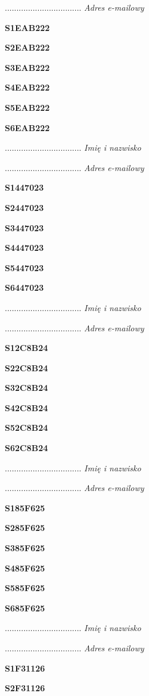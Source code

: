 .................................
\textit{Adres e-mailowy}

\Large \textbf{S1EAB222}

\Large \textbf{S2EAB222}

\Large \textbf{S3EAB222}

\Large \textbf{S4EAB222}

\Large \textbf{S5EAB222}

\Large \textbf{S6EAB222}

.................................
\textit{Imię i nazwisko}

.................................
\textit{Adres e-mailowy}

\Large \textbf{S1447023}

\Large \textbf{S2447023}

\Large \textbf{S3447023}

\Large \textbf{S4447023}

\Large \textbf{S5447023}

\Large \textbf{S6447023}

.................................
\textit{Imię i nazwisko}

.................................
\textit{Adres e-mailowy}

\Large \textbf{S12C8B24}

\Large \textbf{S22C8B24}

\Large \textbf{S32C8B24}

\Large \textbf{S42C8B24}

\Large \textbf{S52C8B24}

\Large \textbf{S62C8B24}

.................................
\textit{Imię i nazwisko}

.................................
\textit{Adres e-mailowy}

\Large \textbf{S185F625}

\Large \textbf{S285F625}

\Large \textbf{S385F625}

\Large \textbf{S485F625}

\Large \textbf{S585F625}

\Large \textbf{S685F625}

.................................
\textit{Imię i nazwisko}

.................................
\textit{Adres e-mailowy}

\Large \textbf{S1F31126}

\Large \textbf{S2F31126}

